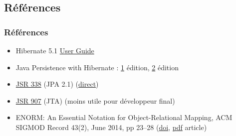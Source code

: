 \documentclass[english, french]{beamer}
\begin{document}

\subsection{Références}
\begin{frame}
	\frametitle{Références}
	\begin{itemize}
		\item Hibernate 5.1 \href{http://docs.jboss.org/hibernate/orm/5.1/userguide/html_single/Hibernate_User_Guide.html}{User Guide}
		\item Java Persistence with Hibernate : \href{http://gen.lib.rus.ec/book/index.php?md5=5D9F8BC8761804C0EBB8FE6A60BCF817}{1\iere} édition, \href{https://www.manning.com/books/java-persistence-with-hibernate-second-edition}{2\ieme} édition
		\item \href{https://jcp.org/en/jsr/detail?id=338}{JSR 338} (JPA 2.1) (\href{http://download.oracle.com/otn-pub/jcp/persistence-2_1-fr-eval-spec/JavaPersistence.pdf}{direct})
		\item \href{https://jcp.org/en/jsr/detail?id=907}{JSR 907} (JTA) (moins utile pour développeur final)
		\item ENORM: An Essential Notation for Object-Relational Mapping, ACM SIGMOD Record 43(2), June 2014, pp 23–28 (\href{http://dx.doi.org/10.1145/2694413.2694418}{doi}, \href{http://www.sigmod.org/publications/sigmod-record/1406/pdfs/05.articles.Torres.pdf}{pdf} article)
	\end{itemize}
\end{frame}
\end{document}
